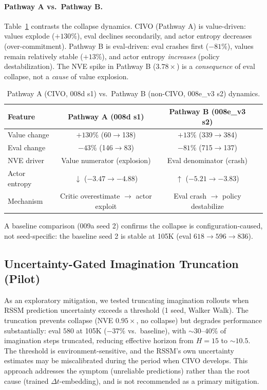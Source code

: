 \documentclass[10pt,letterpaper]{article}
\newcommand{\dt}{\Delta t}
\begin{document}
\paragraph{Pathway A vs.\ Pathway B.}
Table~\ref{tab:pathways} contrasts the collapse dynamics.
CIVO (Pathway A) is value-driven: values explode ($+130\%$), eval declines secondarily, and actor entropy decreases (over-commitment).
Pathway B is eval-driven: eval crashes first ($-81\%$), values remain relatively stable ($+13\%$), and actor entropy \emph{increases} (policy destabilization).
The NVE spike in Pathway B ($3.78\times$) is a \emph{consequence} of eval collapse, not a \emph{cause} of value explosion.

\begin{table}[h]
\centering
\caption{Pathway A (CIVO, 008d s1) vs.\ Pathway B (non-CIVO, 008e\_v3 s2) dynamics.}
\label{tab:pathways}
\small
\begin{tabular}{lccc}
\toprule
Feature & Pathway A (008d s1) & Pathway B (008e\_v3 s2) \\
\midrule
Value change     & $+130\%$ (60$\to$138) & $+13\%$ (339$\to$384) \\
Eval change      & $-43\%$ (146$\to$83)  & $-81\%$ (715$\to$137) \\
NVE driver       & Value numerator (explosion) & Eval denominator (crash) \\
Actor entropy    & $\downarrow$ ($-3.47\to{-4.88}$) & $\uparrow$ ($-5.21\to{-3.83}$) \\
Mechanism        & Critic overestimate $\to$ actor exploit & Eval crash $\to$ policy destabilize \\
\bottomrule
\end{tabular}
\end{table}

A baseline comparison (009a seed 2) confirms the collapse is configuration-caused, not seed-specific: the baseline seed 2 is stable at 105K (eval $618 \to 596 \to 836$).

\subsection{Uncertainty-Gated Imagination Truncation (Pilot)}
\label{sec:truncation}

As an exploratory mitigation, we tested truncating imagination rollouts when RSSM prediction uncertainty exceeds a threshold (1 seed, Walker Walk).
The truncation prevents collapse (NVE $0.95\times$, no collapse) but degrades performance substantially: eval $580$ at 105K ($-37\%$ vs.\ baseline), with ${\sim}30$--$40\%$ of imagination steps truncated, reducing effective horizon from $H{=}15$ to ${\sim}10.5$.
The threshold is environment-sensitive, and the RSSM's own uncertainty estimates may be miscalibrated during the period when CIVO develops.
This approach addresses the symptom (unreliable predictions) rather than the root cause (trained $\dt$-embedding), and is not recommended as a primary mitigation.
\end{document}
